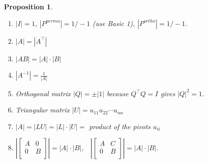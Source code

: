 \documentclass[13pt]{article}
\newtheorem{proposition}[theorem]{Proposition}
\theoremstyle{definition}
\theoremstyle{remark}
\begin{document}
\begin{multicols}{2}
    \begin{proposition}
    \begin{enumerate}
        \item $|I| = 1$, $|P^{permu}| = 1/-1$ (use Basic 1), $|P^{ortho}| = 1/-1$.
        \item $|A| = |A^\top|$
        \item $|AB| = |A|\cdot|B|$
        \item $|A^{-1}| = \frac{1}{|A|}$
    \item Orthogonal matrix $|Q|= \pm |1|$ because $Q^\top Q=I$ gives $|Q|^2=1$.
    \item Triangular matrix $|U|=u_{11} u_{22} \cdots u_{n n}$
    \item 
$|A| = |L U|=|L|\cdot |U|=$ product of the pivots $u_{i i}$
\item $\left|\begin{bmatrix}
    A  & 0\\
    0  & B\\
\end{bmatrix}\right| = |A|\cdot |B|$,$ \quad \left|\begin{bmatrix}
    A  & C\\
    0  & B\\
\end{bmatrix}\right| = |A|\cdot |B|$.
    \end{enumerate}
\end{proposition}
\end{multicols}

\headrule
\end{document}
